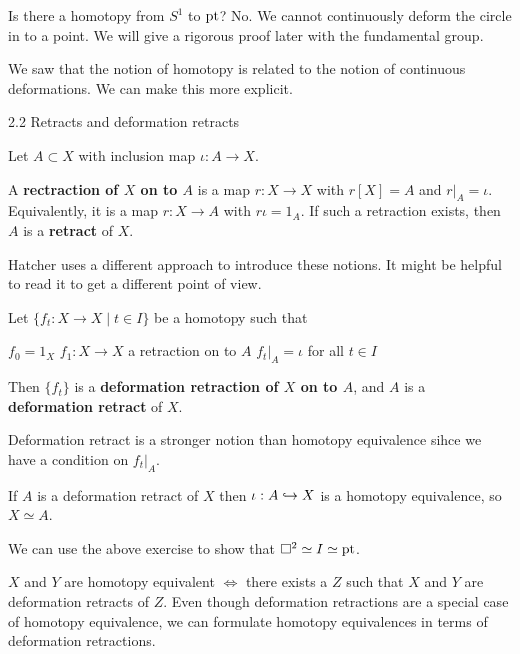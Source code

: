 Is there a homotopy from $S^1$ to $\operatorname{pt}$?
No.
We cannot continuously deform the circle in to a point.
We will give a rigorous proof later with the fundamental group.

We saw that the notion of homotopy is related to the notion of continuous deformations.
We can make this more explicit.

2.2 Retracts and deformation retracts

Let $A \subset X$ with inclusion map $\iota: A \to X$.

\begin{defn}
	A \textbf{rectraction of $X$ on to $A$} is a map $r:X \to X$ with $r[X]=A$ and $r|_A=\iota$.
	Equivalently, it is a map $r:X \to A$ with $r\iota=1_A$.
	If such a retraction exists, then $A$ is a \textbf{retract} of $X$.
\end{defn}

\begin{rmk}
	Hatcher uses a different approach to introduce these notions.
	It might be helpful to read it to get a different point of view.
\end{rmk}

\begin{defn}
	Let $\{f_t:X \to X \mid t \in I\}$ be a homotopy such that
	\begin{itm}
		\io $f_0=1_X$
		\io $f_1:X \to X$ a retraction on to $A$
		\io $f_t|_A=\iota$ for all $t \in I$
	\end{itm}
	Then $\{f_t\}$ is a \textbf{deformation retraction of $X$ on to $A$}, and $A$ is a \textbf{deformation retract} of $X$.
\end{defn}

\begin{rmk}
	Deformation retract is a stronger notion than homotopy equivalence sihce we have a condition on $f_t|_A$.
\end{rmk}

\begin{exer}
	If $A$ is a deformation retract of $X$ then $\iota:A \hookrightarrow X$ is a homotopy equivalence, so $X \simeq A$.
\end{exer}

\begin{rmk}
	We can use the above exercise to show that $\square^2 \simeq I \simeq \operatorname{pt}$.
\end{rmk}

\begin{rmk}
	$X$ and $Y$ are homotopy equivalent $\iff$ there exists a $Z$ such that $X$ and $Y$ are deformation retracts of $Z$.
	Even though deformation retractions are a special case of homotopy equivalence, we can formulate homotopy equivalences in terms of deformation retractions.
\end{rmk}